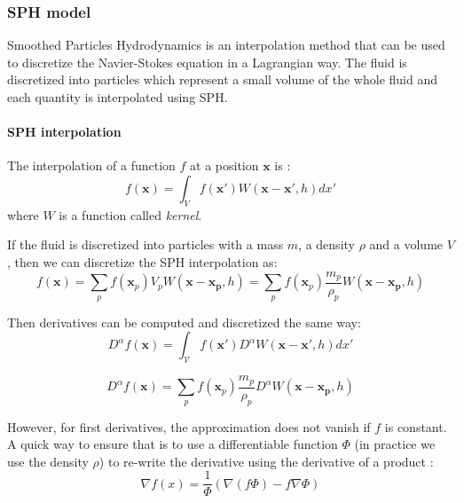 \subsubsection{SPH model}
Smoothed Particles Hydrodynamics is an interpolation method that can be used to discretize the Navier-Stokes equation in a Lagrangian way. The fluid is discretized into particles which represent a small volume of the whole fluid and each quantity is interpolated using SPH.

\paragraph{SPH interpolation}
The interpolation of a function $f$ at a position $\mathbf{x}$ is :
\begin{equation}
f(\mathbf{x}) = \int_{V} f(\mathbf{x'})W(\mathbf{x}-\mathbf{x'}, h)dx'
\end{equation}
where $W$ is a function called \emph{kernel}. 

If the fluid is discretized into particles with a mass $m$, a density $\rho$ and a volume $V$, then we can discretize the SPH interpolation as:
\begin{equation}
f(\mathbf{x}) = \sum_{p} f(\mathbf{x}_{p})V_{p} W(\mathbf{x}-\mathbf{x_{p}},h) = \sum_{p} f(\mathbf{x}_{p})\frac{m_{p}}{\rho_{p}} W(\mathbf{x}-\mathbf{x_{p}},h)
\end{equation}

Then derivatives can be computed and discretized the same way:
\begin{equation}
D^{\alpha} f(\mathbf{x}) = \int_{\mathcal{V}} f(\mathbf{x'}) D^{\alpha} W(\mathbf{x}-\mathbf{x'}, h)dx'
\end{equation}

\begin{equation}
D^{\alpha} f(\mathbf{x})= \sum_{p} f(\mathbf{x}_{p})\frac{m_{p}}{\rho_{p}} D^{\alpha} W(\mathbf{x}-\mathbf{x_{p}},h)
\end{equation}

However, for first derivatives, the approximation does not vanish if $f$ is constant. A quick way to ensure that is to use a differentiable function $\Phi$ (in practice we use the density $\rho$) to re-write the derivative using the derivative of a product :
\begin{equation}
\nabla f(x) = \frac{1}{\Phi}\left(\nabla (f \Phi) - f \nabla \Phi \right)
\end{equation}

